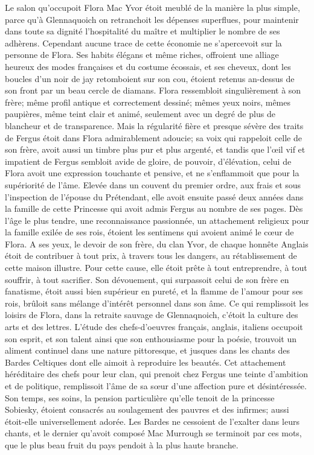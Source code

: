 Le salon qu’occupoit Flora Mac Yvor étoit meublé de la manière la plus simple, parce qu’à Glennaquoich on retranchoit les dépenses superflues, pour maintenir dans toute sa dignité l’hospitalité du maître et multiplier le nombre de ses adhèrens. Cependant aucune trace de cette économie ne s’apercevoit sur la personne de Flora. Ses habits élégans et même riches, offroient une alliage\setcounter{page}{125} heureux des modes françaises et du costume écossais, et ses cheveux, dont les boucles d'un noir de jay retomboient sur son cou, étoient retenus an-dessus de son front par un beau cercle de diamans.
Flora ressembloit singulièrement à son frère; même profil antique et correctement dessiné; mêmes yeux noirs, mêmes paupières, même teint clair et animé, seulement avec un degré de plus de blancheur et de transparence. Mais la régularité fière et presque sévère des traits de Fergus étoit dans Flora admirablement adoucie; sa voix qui rappeloit celle de son frère, avoit aussi un timbre plus pur et plus argenté, et tandis que l'œil vif et impatient de Fergus sembloit avide de gloire, de pouvoir, d'élévation, celui de Flora avoit une expression touchante et pensive, et ne s'enflammoit que pour la supériorité de l'âme. Elevée dans un couvent du premier ordre, aux frais et sous l'inspection de l'épouse du Prétendant, elle avoit ensuite passé deux années dans la famille de cette Princesse qui avoit admis Fergus au nombre de ses pages. Dès l'âge le plus tendre, une reconnaissance passionnée, un attachement religieux pour la famille exilée de ses rois, étoient les sentimens qui avoient animé le cœur de Flora.\setcounter{page}{126} A ses yeux, le devoir de son frère, du clan Yvor, de chaque honnête Anglais étoit de contribuer à tout prix, à travers tous les dangers, au rétablissement de cette maison illustre. Pour cette cause, elle étoit prête à tout entreprendre, à tout souffrir, à tout sacrifier. Son dévouement, qui surpassoit celui de son frère en fanatisme, étoit aussi bien supérieur en pureté, et la flamme de l'amour pour ses rois, brûloit sans mélange d'intérêt personnel dans son âme.
Ce qui remplissoit les loisirs de Flora, dans la retraite sauvage de Glennaqnoich, c'étoit la culture des arts et des lettres. L'étude des chefs-d'oeuvres français, anglais, italiens occupoit son esprit, et son talent ainsi que son enthousiasme pour la poésie, trouvoit un aliment continuel dans une nature pittoresque, et jusques dans les chants des Bardes Celtiques dont elle aimoit à reproduire les beautés.
Cet attachement héréditaire des chefs pour leur clan, qui prenoit chez Fergus une teinte d'ambition et de politique, remplissoit l'âme de sa sœur d'une affection pure et désintéressée. Son temps, ses soins, la pension particulière qu'elle tenoit de la princesse Sobiesky, étoient consacrés au soulagement des pauvres et des infirmes; aussi étoit-elle universellement\setcounter{page}{127} adorée. Les Bardes ne cessoient de l'exalter dans leurs chants, et le dernier qu'avoit composé Mac Murrough se terminoit par ces mots, que le plus beau fruit du pays pendoit à la plus haute branche.
